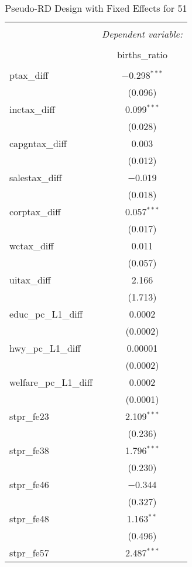 
\begin{table}[!htbp] \centering 
  \caption{Pseudo-RD Design with Fixed Effects for  51} 
  \label{} 
\begin{tabular}{@{\extracolsep{5pt}}lc} 
\\[-1.8ex]\hline 
\hline \\[-1.8ex] 
 & \multicolumn{1}{c}{\textit{Dependent variable:}} \\ 
\cline{2-2} 
\\[-1.8ex] & births\_ratio \\ 
\hline \\[-1.8ex] 
 ptax\_diff & $-$0.298$^{***}$ \\ 
  & (0.096) \\ 
  inctax\_diff & 0.099$^{***}$ \\ 
  & (0.028) \\ 
  capgntax\_diff & 0.003 \\ 
  & (0.012) \\ 
  salestax\_diff & $-$0.019 \\ 
  & (0.018) \\ 
  corptax\_diff & 0.057$^{***}$ \\ 
  & (0.017) \\ 
  wctax\_diff & 0.011 \\ 
  & (0.057) \\ 
  uitax\_diff & 2.166 \\ 
  & (1.713) \\ 
  educ\_pc\_L1\_diff & 0.0002 \\ 
  & (0.0002) \\ 
  hwy\_pc\_L1\_diff & 0.00001 \\ 
  & (0.0002) \\ 
  welfare\_pc\_L1\_diff & 0.0002 \\ 
  & (0.0001) \\ 
  stpr\_fe23 & 2.109$^{***}$ \\ 
  & (0.236) \\ 
  stpr\_fe38 & 1.796$^{***}$ \\ 
  & (0.230) \\ 
  stpr\_fe46 & $-$0.344 \\ 
  & (0.327) \\ 
  stpr\_fe48 & 1.163$^{**}$ \\ 
  & (0.496) \\ 
  stpr\_fe57 & 2.487$^{***}$ \\ 

\end{tabular}
\end{table}
